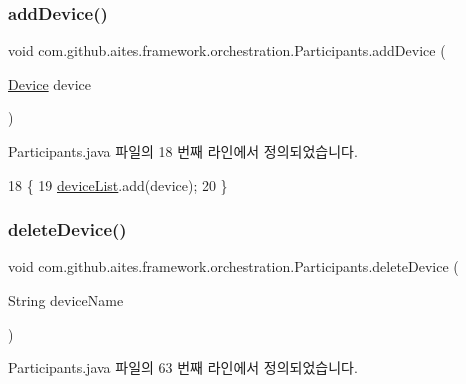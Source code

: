 \subsubsection{\texorpdfstring{add\+Device()}{addDevice()}}
{\footnotesize\ttfamily void com.\+github.\+aites.\+framework.\+orchestration.\+Participants.\+add\+Device (\begin{DoxyParamCaption}\item[{\mbox{\hyperlink{classcom_1_1github_1_1aites_1_1framework_1_1orchestration_1_1_device}{Device}}}]{device }\end{DoxyParamCaption})}



Participants.\+java 파일의 18 번째 라인에서 정의되었습니다.


\begin{DoxyCode}
18                                         \{
19         \mbox{\hyperlink{classcom_1_1github_1_1aites_1_1framework_1_1orchestration_1_1_participants_ab90ca1b5cf16aec6e3e6608df4a8d2ad}{deviceList}}.add(device);
20     \}
\end{DoxyCode}
\mbox{\label{classcom_1_1github_1_1aites_1_1framework_1_1orchestration_1_1_participants_a4f57c5d5f0c622b7668c55ad4a02def9}} 
\subsubsection{\texorpdfstring{delete\+Device()}{deleteDevice()}}
{\footnotesize\ttfamily void com.\+github.\+aites.\+framework.\+orchestration.\+Participants.\+delete\+Device (\begin{DoxyParamCaption}\item[{String}]{device\+Name }\end{DoxyParamCaption})}



Participants.\+java 파일의 63 번째 라인에서 정의되었습니다.


